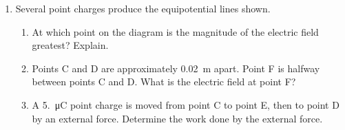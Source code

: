 \documentclass{../../oss-apphys}
\begin{document}
\begin{enumerate}[leftmargin=15pt]
\item Several point charges produce the equipotential lines shown.
  \begin{enumerate}[noitemsep]
  \item At which point on the diagram is the magnitude of the electric field
    greatest? Explain.
  \item Points C and D are approximately \SI{.02}{\metre} apart. Point F is
    halfway between points C and D. What is the electric field at point F?
  \item A \SI{5.}{\micro\coulomb} point charge is moved from point C to point
    E, then to point D by an external force. Determine the work done by the
    external force.
  \end{enumerate}
\end{enumerate}
\end{document}
